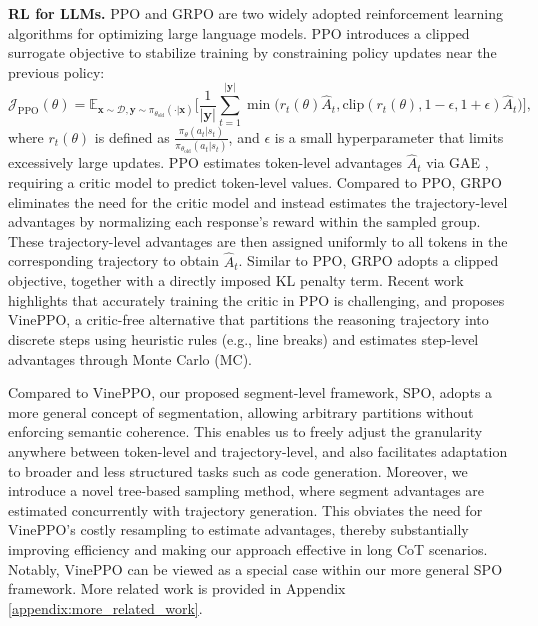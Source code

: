 \textbf{RL for LLMs.} PPO \cite{schulman2017proximalpolicyoptimizationalgorithms, ouyang2022traininglanguagemodelsfollow} and GRPO \cite{shao2024deepseekmathpushinglimitsmathematical} are two widely adopted reinforcement learning algorithms for optimizing large language models. PPO introduces a clipped surrogate objective to stabilize training by constraining policy updates near the previous policy:
\begin{equation}
\mathcal{J}_{\text{PPO}}(\theta) = \mathbb{E}_{\boldsymbol x \sim \mathcal{D}, \boldsymbol y \sim \pi_{\theta_{\text{old}}}(\cdot|\boldsymbol x)} \bigg[ \frac{1}{|\boldsymbol y|} \sum_{t=1}^{|\boldsymbol y|} \min\Big( r_t(\theta) \hat A_t, \mathrm{clip}(r_t(\theta), 1 - \epsilon, 1 + \epsilon) \hat A_t \Big) \bigg],
\label{eq:PPO}
\end{equation}
where \( r_t(\theta) \) is defined as $\frac{\pi_{\theta}(a_t|s_t)}{\pi_{\theta_{\text{old}}}(a_t|s_t)}$, and \(\epsilon\) is a small hyperparameter that limits excessively large updates. PPO estimates token-level advantages \(\hat A_t\) via GAE \cite{schulman2018highdimensionalcontinuouscontrolusing}, requiring a critic model to predict token-level values. Compared to PPO, GRPO eliminates the need for the critic model and instead estimates the trajectory-level advantages by normalizing each response's reward within the sampled group. These trajectory-level advantages are then assigned uniformly to all tokens in the corresponding trajectory to obtain \(\hat A_t\). Similar to PPO, GRPO adopts a clipped objective, together with a directly imposed KL penalty term. Recent work \cite{kazemnejad2024vineppounlockingrlpotential} highlights that accurately training the critic in PPO is challenging, and proposes VinePPO, a critic-free alternative that partitions the reasoning trajectory into discrete steps using heuristic rules (e.g., line breaks) and estimates step-level advantages through Monte Carlo (MC).

Compared to VinePPO, our proposed segment-level framework, SPO, adopts a more general concept of segmentation, allowing arbitrary partitions without enforcing semantic coherence. This enables us to freely adjust the granularity anywhere between token-level and trajectory-level, and also facilitates adaptation to broader and less structured tasks such as code generation. Moreover, we introduce a novel tree-based sampling method, where segment advantages are estimated concurrently with trajectory generation. This obviates the need for VinePPO’s costly resampling to estimate advantages, thereby substantially improving efficiency and making our approach effective in long CoT scenarios. Notably, VinePPO can be viewed as a special case within our more general SPO framework. More related work is provided in Appendix \ref{appendix:more_related_work}.